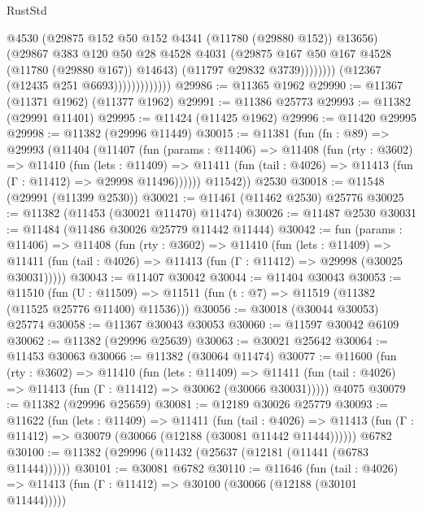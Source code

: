\begin{lexlean}{RustStd}
\begin{coremodule}
                                      @4530
                                      (@29875 @152 @50 @152 @4341 (@11780 (@29880 @152)) @13656)
                                      (@29867
                                        @383
                                        @120
                                        @50
                                        @28
                                        @4528
                                        @4031
                                        (@29875 @167 @50 @167 @4528 (@11780 (@29880 @167)) @14643)
                                        (@11797 @29832 @3739))))))))
                          (@12367 (@12435 @251 @6693)))))))))))))
@29986 := @11365 @1962
@29990 := @11367 (@11371 @1962) (@11377 @1962)
@29991 := @11386 @25773
@29993 := @11382 (@29991 @11401)
@29995 := @11424 (@11425 @1962)
@29996 := @11420 @29995
@29998 := @11382 (@29996 @11449)
@30015 := @11381
    (fun (fn : @89) =>
    @29993
      (@11404
        (@11407
          (fun (params : @11406) =>
          @11408
            (fun (rty : @3602) =>
            @11410
              (fun (lets : @11409) =>
              @11411 (fun (tail : @4026) => @11413 (fun (Γ : @11412) => @29998 @11496))))))
        @11542))
    @2530
@30018 := @11548 (@29991 (@11399 @2530))
@30021 := @11461 (@11462 @2530) @25776
@30025 := @11382 (@11453 (@30021 @11470) @11474)
@30026 := @11487 @2530
@30031 := @11484 (@11486 @30026 @25779 @11442 @11444)
@30042 := fun (params : @11406) =>
  @11408
    (fun (rty : @3602) =>
    @11410
      (fun (lets : @11409) =>
      @11411 (fun (tail : @4026) => @11413 (fun (Γ : @11412) => @29998 (@30025 @30031)))))
@30043 := @11407 @30042
@30044 := @11404 @30043
@30053 := @11510
    (fun (U : @11509) => @11511 (fun (t : @7) => @11519 (@11382 (@11525 @25776 @11400) @11536)))
@30056 := @30018 (@30044 @30053) @25774
@30058 := @11367 @30043 @30053
@30060 := @11597 @30042 @6109
@30062 := @11382 (@29996 @25639)
@30063 := @30021 @25642
@30064 := @11453 @30063
@30066 := @11382 (@30064 @11474)
@30077 := @11600
    (fun (rty : @3602) =>
    @11410
      (fun (lets : @11409) =>
      @11411 (fun (tail : @4026) => @11413 (fun (Γ : @11412) => @30062 (@30066 @30031)))))
    @4075
@30079 := @11382 (@29996 @25659)
@30081 := @12189 @30026 @25779
@30093 := @11622
    (fun (lets : @11409) =>
    @11411
      (fun (tail : @4026) =>
      @11413 (fun (Γ : @11412) => @30079 (@30066 (@12188 (@30081 @11442 @11444))))))
    @6782
@30100 := @11382 (@29996 (@11432 (@25637 (@12181 (@11441 (@6783 @11444))))))
@30101 := @30081 @6782
@30110 := @11646
    (fun (tail : @4026) => @11413 (fun (Γ : @11412) => @30100 (@30066 (@12188 (@30101 @11444)))))

\end{coremodule}
\end{lexlean}
